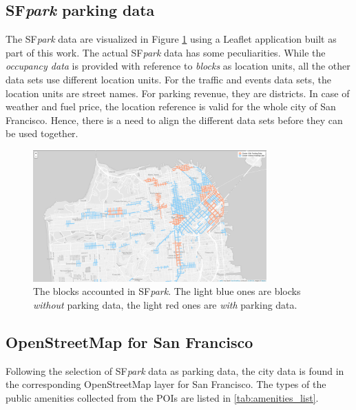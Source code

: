 \subsection{SF\textit{park} parking data}
\label{experimental_setup:sfpark}
The SF\textit{park} data are visualized in Figure \ref{fig:before_clustering} using a Leaflet application built as part of this work.
The actual SF\textit{park} data has some peculiarities.
While the \textit{occupancy data} is provided with reference to \textit{blocks} as location units, all the other data sets use different location units.
For the traffic and events data sets, the location units are street names.
For parking revenue, they are districts.
In case of weather and fuel price, the location reference is valid for the whole city of San Francisco. 
Hence, there is a need to align the different data sets before they can be used together.

\begin{figure}[!ht]
	\centering
	\includegraphics[width=0.8\textwidth]{graphics/initial_view_before_clusteringV7.png}
	\caption{The blocks accounted in SF\textit{park}. The light blue ones are blocks \textit{without} parking data, the light red ones are \textit{with} parking data.}
	\label{fig:before_clustering}
\end{figure}

\subsection{OpenStreetMap for San Francisco}
\label{experimental_setup:osm_for_sf}
Following the selection of SF\textit{park} data as parking data, the city data is found in the corresponding OpenStreetMap layer for San Francisco.
The types of the public amenities collected from the POIs are listed in \cref{tab:amenities_list}.

